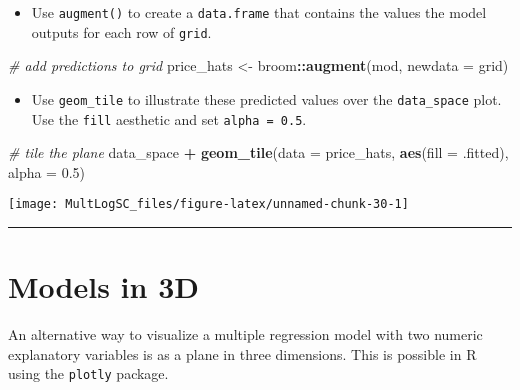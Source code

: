 \documentclass[]{book}
\newenvironment{Shaded}{\begin{snugshade}}{\end{snugshade}}
\newcommand{\KeywordTok}[1]{\textcolor[rgb]{0.13,0.29,0.53}{\textbf{#1}}}
\newcommand{\DataTypeTok}[1]{\textcolor[rgb]{0.13,0.29,0.53}{#1}}
\newcommand{\FloatTok}[1]{\textcolor[rgb]{0.00,0.00,0.81}{#1}}
\newcommand{\StringTok}[1]{\textcolor[rgb]{0.31,0.60,0.02}{#1}}
\newcommand{\CommentTok}[1]{\textcolor[rgb]{0.56,0.35,0.01}{\textit{#1}}}
\newcommand{\OperatorTok}[1]{\textcolor[rgb]{0.81,0.36,0.00}{\textbf{#1}}}
\newcommand{\NormalTok}[1]{#1}
\providecommand{\tightlist}{%
  \setlength{\itemsep}{0pt}\setlength{\parskip}{0pt}}
\begin{document}
\begin{itemize}
\tightlist
\item
  Use \texttt{augment()} to create a \texttt{data.frame} that contains
  the values the model outputs for each row of \texttt{grid}.
\end{itemize}

\begin{Shaded}
\begin{Highlighting}[]
\CommentTok{# add predictions to grid}
\NormalTok{price_hats <-}\StringTok{ }\NormalTok{broom}\OperatorTok{::}\KeywordTok{augment}\NormalTok{(mod, }\DataTypeTok{newdata =}\NormalTok{ grid)}
\end{Highlighting}
\end{Shaded}

\begin{itemize}
\tightlist
\item
  Use \texttt{geom\_tile} to illustrate these predicted values over the
  \texttt{data\_space} plot. Use the \texttt{fill} aesthetic and set
  \texttt{alpha\ =\ 0.5}.
\end{itemize}

\begin{Shaded}
\begin{Highlighting}[]
\CommentTok{# tile the plane}
\NormalTok{data_space }\OperatorTok{+}\StringTok{ }
\StringTok{   }\KeywordTok{geom_tile}\NormalTok{(}\DataTypeTok{data =}\NormalTok{ price_hats, }
             \KeywordTok{aes}\NormalTok{(}\DataTypeTok{fill =}\NormalTok{ .fitted), }\DataTypeTok{alpha =} \FloatTok{0.5}\NormalTok{)}
\end{Highlighting}
\end{Shaded}

\begin{center}\texttt{[image: MultLogSC\_files/figure-latex/unnamed-chunk-30-1]} \end{center}

\begin{center}\rule{0.5\linewidth}{\linethickness}\end{center}

\section{Models in 3D}\label{models-in-3d}

An alternative way to visualize a multiple regression model with two
numeric explanatory variables is as a plane in three dimensions. This is
possible in R using the \texttt{plotly} package.
\end{document}
